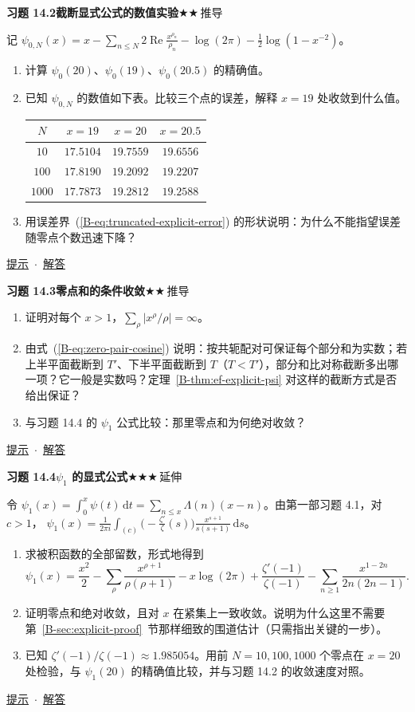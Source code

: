 \documentclass[11pt,a4paper]{article}
\newcommand{\dd}{\,\mathrm{d}}
\renewcommand{\Re}{\operatorname{Re}}
\newcommand{\bref}[1]{\ref*{B-#1}}
\newcommand{\lvII}{$\bigstar\bigstar$\,推导}
\newcommand{\lvIII}{$\bigstar\bigstar\bigstar$\,延伸}
\newcommand{\Q}[3]{%
  \par\addvspace{1.1em}\noindent
  \hypertarget{q:#1}{}\textbf{习题 #1}\quad\textbf{#3}\hfill{\small #2}\par
  \nopagebreak\smallskip}
\newcommand{\toHint}[1]{\hfill{\small\hyperlink{h:#1}{提示}\ $\cdot$\ \hyperlink{s:#1}{解答}}}
\begin{document}
\Q{14.2}{\lvII}{截断显式公式的数值实验}
记 $\psi_{0,N}(x)=x-\sum_{n\le N}2\Re\frac{x^{\rho_n}}{\rho_n}-\log(2\pi)-\frac12\log(1-x^{-2})$。
\begin{enumerate}
  \item 计算 $\psi_0(20)$、$\psi_0(19)$、$\psi_0(20.5)$ 的精确值。
  \item 已知 $\psi_{0,N}$ 的数值如下表。比较三个点的误差，解释 $x=19$ 处收敛到什么值。
  \begin{center}
  \small
  \begin{tabular}{@{}cccc@{}}
  \toprule
  $N$ & $x=19$ & $x=20$ & $x=20.5$ \\
  \midrule
  $10$ & $17.5104$ & $19.7559$ & $19.6556$ \\
  $100$ & $17.8190$ & $19.2092$ & $19.2207$ \\
  $1000$ & $17.7873$ & $19.2812$ & $19.2588$ \\
  \bottomrule
  \end{tabular}
  \end{center}
  \item 用误差界~(\bref{eq:truncated-explicit-error}) 的形状说明：为什么不能指望误差随零点个数迅速下降？
\end{enumerate}
\toHint{14.2}

\Q{14.3}{\lvII}{零点和的条件收敛}
\begin{enumerate}
  \item 证明对每个 $x>1$，$\sum_\rho|x^\rho/\rho|=\infty$。
  \item 由式~(\bref{eq:zero-pair-cosine}) 说明：按共轭配对可保证每个部分和为实数；若上半平面截断到 $T'$、下半平面截断到 $T$（$T<T'$），部分和比对称截断多出哪一项？它一般是实数吗？定理~\bref{thm:ef-explicit-psi} 对这样的截断方式是否给出保证？
  \item 与习题 14.4 的 $\psi_1$ 公式比较：那里零点和为何绝对收敛？
\end{enumerate}
\toHint{14.3}

\Q{14.4}{\lvIII}{$\psi_1$ 的显式公式}
令 $\psi_1(x)=\int_0^x\psi(t)\dd t=\sum_{n\le x}\Lambda(n)(x-n)$。由第一部习题 4.1，对 $c>1$，
$\psi_1(x)=\frac1{2\pi i}\int_{(c)}\bigl(-\frac{\zeta'}{\zeta}(s)\bigr)\frac{x^{s+1}}{s(s+1)}\dd s$。
\begin{enumerate}
  \item 求被积函数的全部留数，形式地得到
  \[
    \psi_1(x)=\frac{x^2}2-\sum_\rho\frac{x^{\rho+1}}{\rho(\rho+1)}-x\log(2\pi)+\frac{\zeta'(-1)}{\zeta(-1)}-\sum_{n\ge1}\frac{x^{1-2n}}{2n(2n-1)} .
  \]
  \item 证明零点和绝对收敛，且对 $x$ 在紧集上一致收敛。说明为什么这里不需要第~\bref{sec:explicit-proof}~节那样细致的围道估计（只需指出关键的一步）。
  \item 已知 $\zeta'(-1)/\zeta(-1)\approx1.985054$。用前 $N=10,100,1000$ 个零点在 $x=20$ 处检验，与 $\psi_1(20)$ 的精确值比较，并与习题 14.2 的收敛速度对照。
\end{enumerate}
\toHint{14.4}
\end{document}
